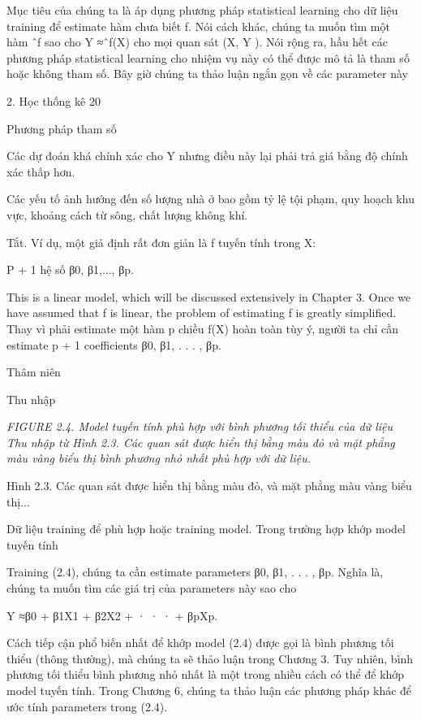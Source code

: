 Mục tiêu của chúng ta là áp dụng phương pháp statistical learning cho dữ liệu training để estimate hàm chưa biết f. Nói cách khác, chúng ta muốn tìm một hàm ˆf sao cho Y ≈ˆf(X) cho mọi quan sát (X, Y ). Nói rộng ra, hầu hết các phương pháp statistical learning cho nhiệm vụ này có thể được mô tả là tham số hoặc không tham số. Bây giờ chúng ta thảo luận ngắn gọn về các parameter này

2. Học thống kê 20

Phương pháp tham số

Các dự đoán khá chính xác cho Y nhưng điều này lại phải trả giá bằng độ chính xác thấp hơn.

Các yếu tố ảnh hưởng đến số lượng nhà ở bao gồm tỷ lệ tội phạm, quy hoạch khu vực, khoảng cách từ sông, chất lượng không khí.

Tắt. Ví dụ, một giả định rất đơn giản là f tuyến tính trong X:

P + 1 hệ số β0, β1,..., βp.

This is a linear model, which will be discussed extensively in Chapter 3. Once we have assumed that f is linear, the problem of estimating f is greatly simplified. Thay vì phải estimate một hàm p chiều f(X) hoàn toàn tùy ý, người ta chỉ cần estimate p + 1 coefficients β0, β1, . . . , βp.

Thâm niên

Thu nhập

\noindent\textit{FIGURE 2.4. Model tuyến tính phù hợp với bình phương tối thiểu của dữ liệu Thu nhập từ Hình 2.3. Các quan sát được hiển thị bằng màu đỏ và mặt phẳng màu vàng biểu thị bình phương nhỏ nhất phù hợp với dữ liệu.}

Hình 2.3. Các quan sát được hiển thị bằng màu đỏ, và mặt phẳng màu vàng biểu thị...

Dữ liệu training để phù hợp hoặc training model. Trong trường hợp khớp model tuyến tính

Training (2.4), chúng ta cần estimate parameters β0, β1, . . . , βp. Nghĩa là, chúng ta muốn tìm các giá trị của parameters này sao cho

Y ≈β0 + β1X1 + β2X2 + · · · + βpXp.

Cách tiếp cận phổ biến nhất để khớp model (2.4) được gọi là bình phương tối thiểu (thông thường), mà chúng ta sẽ thảo luận trong Chương 3. Tuy nhiên, bình phương tối thiểu bình phương nhỏ nhất là một trong nhiều cách có thể để khớp model tuyến tính. Trong Chương 6, chúng ta thảo luận các phương pháp khác để ước tính parameters trong (2.4).

